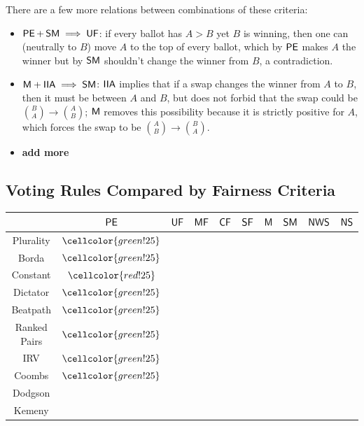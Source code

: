 \documentclass{amsart}
\DeclareMathOperator{\SF}{\sf{SF}}
\DeclareMathOperator{\CF}{\sf{CF}}
\DeclareMathOperator{\MF}{\sf{MF}}
\DeclareMathOperator{\PE}{\sf{PE}}
\DeclareMathOperator{\UF}{\sf{UF}}
\DeclareMathOperator{\IIA}{\sf{IIA}}
\DeclareMathOperator{\SM}{\sf{SM}}
\DeclareMathOperator{\NS}{\sf{NS}}
\DeclareMathOperator{\NWS}{\sf{NWS}}
\begin{document}
There are a few more relations between combinations of these criteria:
\begin{itemize}
	\item $\PE + \SM \implies \UF$: if every ballot has $A>B$ yet $B$ is winning, then one can (neutrally to $B$) move $A$ to the top of every ballot, which by $\PE$ makes $A$ the winner but by $\SM$ shouldn't change the winner from $B$, a contradiction.
	\item $\sf{M} + \IIA \implies \SM$: $\IIA$ implies that if a swap changes the winner from $A$ to $B$, then it must be between $A$ and $B$, but does not forbid that the swap could be ${B\choose A}\to {A\choose B}$; $\sf{M}$ removes this possibility because it is strictly positive for $A$, which forces the swap to be ${A\choose B}\to {B\choose A}$.
	\item \textbf{add more}\\
\end{itemize}

\subsection{Voting Rules Compared by Fairness Criteria}

\begin{center}
	
\begin{tabular}{|c|c|c|c|c|c|c|c|c|c|}
	\hline 
	& $\PE$ & $\UF$ & $\MF$ & $\CF$ & $\SF$ & $\sf{M}$ & $\SM$ & $\NWS$ & $\NS$ \\
	\hline 
	Plurality & $\cellcolor{green!25}$ & & & & & & & &\\
	\hline 
	Borda & $\cellcolor{green!25}$& & & & & & & &\\
	\hline 
	Constant &$\cellcolor{red!25}$ & & & & & & & &\\
	\hline 
	Dictator &$\cellcolor{green!25}$ & & & & & & & &\\
	\hline 
	Beatpath &$\cellcolor{green!25}$ & & & & & & & &\\
	\hline 
	Ranked Pairs &$\cellcolor{green!25}$ & & & & & & & &\\
	\hline 
	IRV &$\cellcolor{green!25}$ & & & & & & & &\\
	\hline 
	Coombs &$\cellcolor{green!25}$ & & & & & & & &\\
	\hline 
	Dodgson & & & & & & & & &\\
	\hline 
	Kemeny & & & & & & & & &\\
	\hline
\end{tabular}

\end{center}
\end{document}

